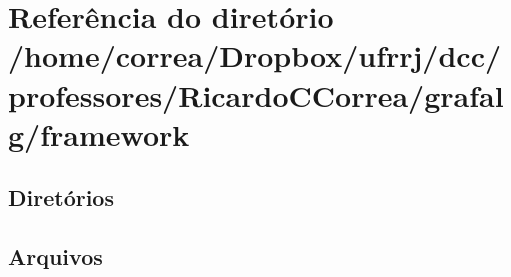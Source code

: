 \section{Referência do diretório /home/correa/\+Dropbox/ufrrj/dcc/professores/\+Ricardo\+C\+Correa/grafalg/framework}
\label{dir_644e041c3a6521da7b27eba0e4eb2b95}
\subsection*{Diretórios}
\begin{DoxyCompactItemize}
\end{DoxyCompactItemize}
\subsection*{Arquivos}
\begin{DoxyCompactItemize}
\end{DoxyCompactItemize}
